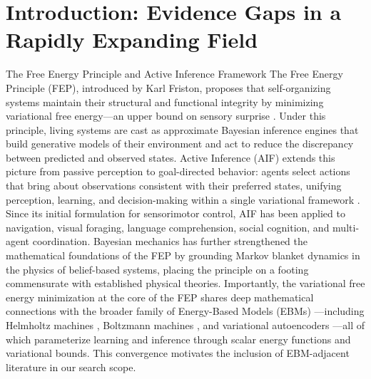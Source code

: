 \documentclass[
  ignorenonframetext,
]{beamer}
\author{\texorpdfstring{}{}}
\date{}
\begin{document}
\section{Introduction: Evidence Gaps in a Rapidly Expanding
Field}\label{introduction-evidence-gaps-in-a-rapidly-expanding-field}

\begin{frame}{The Free Energy Principle and Active Inference Framework}
\protect{}\label{the-free-energy-principle-and-active-inference-framework}
The Free Energy Principle (FEP), introduced by Karl Friston, proposes
that self-organizing systems maintain their structural and functional
integrity by minimizing variational free energy---an upper bound on
sensory surprise \citep{friston2006free, friston2010free}. Under this
principle, living systems are cast as approximate Bayesian inference
engines that build generative models of their environment and act to
reduce the discrepancy between predicted and observed states. Active
Inference (AIF) extends this picture from passive perception to
goal-directed behavior: agents select actions that bring about
observations consistent with their preferred states, unifying
perception, learning, and decision-making within a single variational
framework \citep{parr2022active, friston2017active}. Since its initial
formulation for sensorimotor control, AIF has been applied to
navigation, visual foraging, language comprehension, social cognition,
and multi-agent coordination. Bayesian mechanics
\citep{sakthivadivel2023bayesian} has further strengthened the
mathematical foundations of the FEP by grounding Markov blanket dynamics
in the physics of belief-based systems, placing the principle on a
footing commensurate with established physical theories. Importantly,
the variational free energy minimization at the core of the FEP shares
deep mathematical connections with the broader family of Energy-Based
Models (EBMs) \citep{lecun2006tutorial}---including Helmholtz machines
\citep{dayan1995helmholtz}, Boltzmann machines
\citep{hinton2002training}, and variational autoencoders
\citep{kingma2014auto}---all of which parameterize learning and
inference through scalar energy functions and variational bounds. This
convergence motivates the inclusion of EBM-adjacent literature in our
search scope.
\end{frame}
\end{document}
